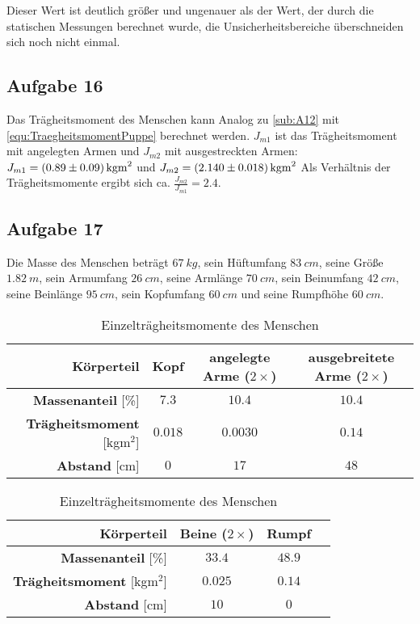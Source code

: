 \documentclass[a4paper, 11pt, ngerman]{scrartcl}
\begin{document}
Dieser Wert ist deutlich größer und ungenauer als der Wert, der durch die statischen Messungen berechnet wurde, die Unsicherheitsbereiche überschneiden sich noch nicht einmal.

\subsection{Aufgabe 16}
Das Trägheitsmoment des Menschen kann Analog zu \cref{sub:A12} mit \cref{equ:TraegheitsmomentPuppe} berechnet werden. $J_{m1}$ ist das Trägheitsmoment mit angelegten Armen und $J_{m2}$ mit ausgestreckten Armen: $J_{m1} = \SI{0.89 \pm 0.09}{kgm^2}$ und $J_{m2} = \SI{2.14 \pm 0.018}{kgm^2}$
Als Verhältnis der Trägheitsmomente ergibt sich ca. $\frac{J_{m2}}{J_{m1}} = 2.4$.

\subsection{Aufgabe 17}
Die Masse des Menschen beträgt $\SI{67}{kg}$, sein Hüftumfang $\SI{83}{cm}$, seine Größe $\SI{1.82}{m}$, sein Armumfang $\SI{26}{cm}$, seine Armlänge $\SI{70}{cm}$, sein Beinumfang $\SI{42}{cm}$, seine Beinlänge $\SI{95}{cm}$, sein Kopfumfang $\SI{60}{cm}$ und seine Rumpfhöhe $\SI{60}{cm}$.
\begin{table}[ht]
\begin{center}\label{tab:Einzeltraegheitsmomente}
\begin{tabular}{r|ccc}\hline
\textbf{Körperteil} & Kopf & angelegte Arme ($2\times$) & ausgebreitete Arme ($2\times$) \\
\hline
\textbf{Massenanteil} [\%] & $7.3$ & $10.4$ & $10.4$ \\
\textbf{Trägheitsmoment} [kgm$^2$] & $0.018$ & $0.0030$ & $0.14$ \\
\textbf{Abstand} [cm] & $0$ & $17$ & $48$ \\
\hline\end{tabular}
\begin{tabular}{r|ccc}\hline
\textbf{Körperteil} & Beine ($2\times$) & Rumpf \\
\hline
\textbf{Massenanteil} [\%] & $33.4$ & $48.9$ \\
\textbf{Trägheitsmoment} [kgm$^2$] & $0.025$ & $0.14$ \\
\textbf{Abstand} [cm] & $10$ & $0$ \\
\hline\end{tabular}
\caption{Einzelträgheitsmomente des Menschen}
\end{center}
\end{table}
\end{document}
